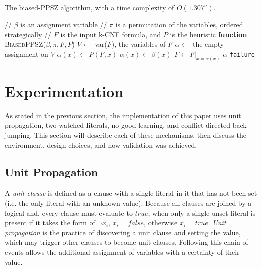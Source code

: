 \documentclass[runningheads]{llncs}
\begin{document}
\begin{algorithm}[h]
\caption{The biased-PPSZ algorithm, with a time complexity of $O(1.307^n).$}
\label{alg:biased-ppsz}
\begin{algorithmic}[1]
    \STATE // $\beta$ is an assignment variable
    \STATE // $\pi$ is a permutation of the variables, ordered strategically
    \STATE // $F$ is the input k-CNF formula, and $P$ is the heuristic
    \STATE \textbf{function} \textsc{BiasedPPSZ}($\beta, \pi, F, P$)
    \STATE $V \xleftarrow{}$ var($F$), the variables of $F$
    \STATE $\alpha \xleftarrow{}$ the empty assignment on $V$
            \STATE $\alpha(x)\xleftarrow{}P(F,x)$
        \ELSE
            \STATE $\alpha(x)\xleftarrow{}\beta(x)$
        \ENDIF
        \STATE $F\xleftarrow{}F|_{x=\alpha(x)}$
    \ENDFOR
        \RETURN $\alpha$
    \ELSE
        \RETURN \texttt{failure}
    \ENDIF
 \end{algorithmic}
\end{algorithm}

\section{Experimentation}
\label{sec:experimentation}

As stated in the previous section, the implementation of this paper uses unit propagation, two-watched literals, no-good learning, and conflict-directed back-jumping. This section will describe each of these mechanisms, then discuss the environment, design choices, and how validation was achieved.

\subsection{Unit Propagation}
A \emph{unit clause} is defined as a clause with a single literal in it that has not been set (i.e. the only literal with an unknown value). Because all clauses are joined by a logical and, every clause must evaluate to $true$, when only a single unset literal is present if it takes the form of $\neg x_i$, $x_i=false$, otherwise $x_i=true$. \emph{Unit propagation} is the practice of discovering a unit clause and setting the value, which may trigger other clauses to become unit clauses. Following this chain of events allows the additional assignment of variables with a certainty of their value.
\end{document}
